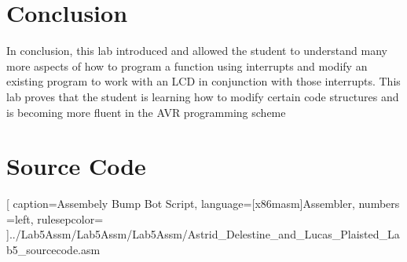 \documentclass[12pt,letterpaper]{article}
\begin{document}
\section{Conclusion}
In conclusion, this lab introduced and allowed the student to understand many more aspects of how to program a function using interrupts and modify an existing program to work with an LCD in conjunction with those interrupts. This lab proves that the student is learning how to modify certain code structures and is becoming more fluent in the AVR programming scheme

\pagebreak

\section{Source Code}%

[
caption=Assembely Bump Bot Script,
language={[x86masm]Assembler},
numbers =left,
rulesepcolor=\color{blue}
]{../Lab5Assm/Lab5Assm/Lab5Assm/Astrid_Delestine_and_Lucas_Plaisted_Lab5_sourcecode.asm}
\end{document}
